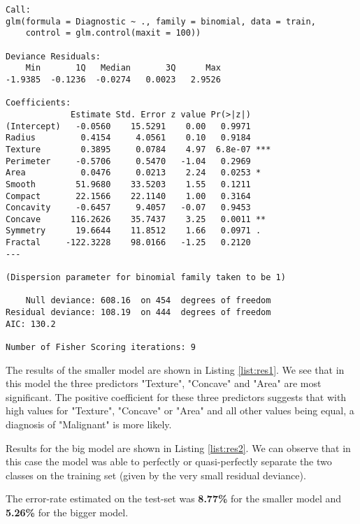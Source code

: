 \documentclass{paper}
\begin{document}
\begin{minipage}{\linewidth}
  \begin{lstlisting}[caption={Summary of the logistic regression model.},
    label=list:res1]
Call:
glm(formula = Diagnostic ~ ., family = binomial, data = train, 
    control = glm.control(maxit = 100))

Deviance Residuals: 
    Min       1Q   Median       3Q      Max  
-1.9385  -0.1236  -0.0274   0.0023   2.9526  

Coefficients:
             Estimate Std. Error z value Pr(>|z|)    
(Intercept)   -0.0560    15.5291    0.00   0.9971    
Radius         0.4154     4.0561    0.10   0.9184    
Texture        0.3895     0.0784    4.97  6.8e-07 ***
Perimeter     -0.5706     0.5470   -1.04   0.2969    
Area           0.0476     0.0213    2.24   0.0253 *  
Smooth        51.9680    33.5203    1.55   0.1211    
Compact       22.1566    22.1140    1.00   0.3164    
Concavity     -0.6457     9.4057   -0.07   0.9453    
Concave      116.2626    35.7437    3.25   0.0011 ** 
Symmetry      19.6644    11.8512    1.66   0.0971 .  
Fractal     -122.3228    98.0166   -1.25   0.2120    
---

(Dispersion parameter for binomial family taken to be 1)

    Null deviance: 608.16  on 454  degrees of freedom
Residual deviance: 108.19  on 444  degrees of freedom
AIC: 130.2

Number of Fisher Scoring iterations: 9
  \end{lstlisting}
\end{minipage}


The results of the smaller model are shown in Listing \ref{list:res1}. We see that in this model the three predictors "Texture", "Concave" and "Area" are most significant. The positive coefficient for these three predictors suggests that with high values for "Texture", "Concave" or "Area" and all other values being equal, a diagnosis of "Malignant" is more likely. 

Results for the big model are shown in Listing \ref{list:res2}. We can observe that in this case the model was able to perfectly or quasi-perfectly separate the two classes on the training set (given by the very small residual deviance). 

The error-rate estimated on the test-set was \textbf{8.77\%} for the smaller model and \textbf{5.26\%} for the bigger model.
\end{document}

